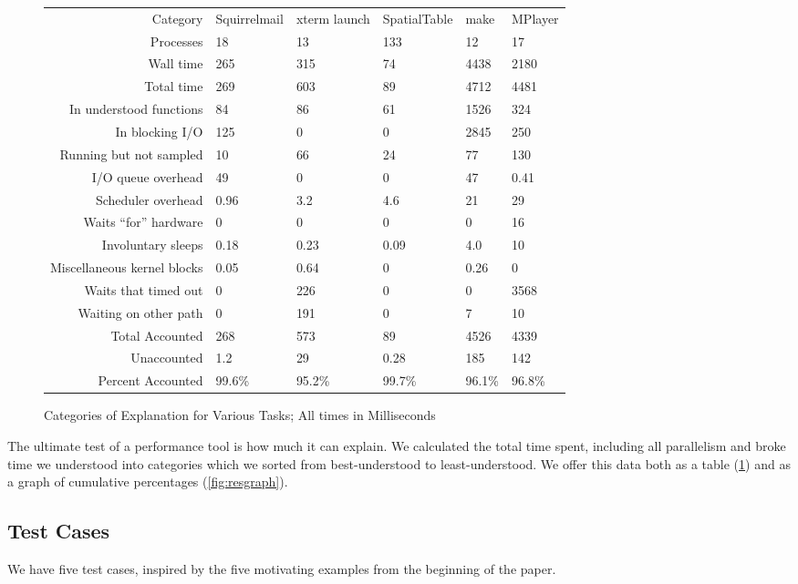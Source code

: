 \documentclass[10pt]{article}
\begin{document}
\begin{figure}[t]
\begin{tabular}{r|C{.77in}C{.8in}C{.77in}C{.77in}C{.77in}}
Category & Squirrelmail & xterm launch & SpatialTable & make & MPlayer\\
Processes & 18 & 13 & 133 & 12 & 17\\
\hline
Wall time & 265 & 315 & 74 & 4438 & 2180\\
Total time & 269 & 603 & 89 & 4712 & 4481\\
\hline
In understood functions & 84 & 86 & 61 & 1526 & 324\\
In blocking I/O & 125 & 0 & 0 & 2845 & 250\\
Running but not sampled & 10 & 66 & 24 & 77 & 130\\
I/O queue overhead & 49 & 0 & 0 & 47 & 0.41\\
Scheduler overhead & 0.96 & 3.2 & 4.6 & 21 & 29\\
Waits ``for'' hardware & 0 & 0 & 0 & 0 & 16\\
Involuntary sleeps & 0.18 & 0.23 & 0.09 & 4.0 & 10\\
Miscellaneous kernel blocks & 0.05 & 0.64 & 0 & 0.26 & 0\\
Waits that timed out & 0 & 226 & 0 & 0 & 3568\\
Waiting on other path & 0 & 191 & 0 & 7 & 10\\
\hline
Total Accounted & 268 & 573 & 89 & 4526 & 4339\\
Unaccounted & 1.2 & 29 & 0.28 & 185 & 142\\
Percent Accounted & 99.6\% & 95.2\% & 99.7\% & 96.1\% & 96.8\%\\
\end{tabular}
\caption{Categories of Explanation for Various Tasks; All times in Milliseconds}
\label{fig:restab}
\end{figure}

The ultimate test of a performance tool is how much it can explain.  We calculated the total time spent, including all parallelism and broke time we understood into categories which we sorted from best-understood to least-understood.  We offer this data both as a table (\ref{fig:restab}) and as a graph of cumulative percentages (\ref{fig:resgraph}).

\subsection{Test Cases}

We have five test cases, inspired by the five motivating examples from the beginning of the paper.
\end{document}
